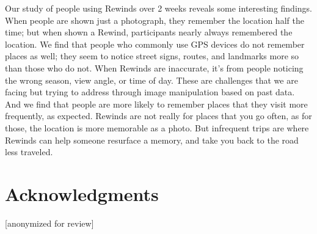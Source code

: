 \documentclass{sigchi}
\begin{document}
Our study of people using Rewinds over 2 weeks reveals some interesting findings. When people are shown just a photograph, they remember the location half the time; but when shown a Rewind, participants nearly always remembered the location. We find that people who commonly use GPS devices do not remember places as well; they seem to notice street signs, routes, and landmarks more so than those who do not. When Rewinds are inaccurate, it's from people noticing the wrong season, view angle, or time of day. These are challenges that we are facing but trying to address through image manipulation based on past data. And we find that people are more likely to remember places that they visit more frequently, as expected. Rewinds are not really for places that you go often, as for those, the location is more memorable as a photo. But infrequent trips are where Rewinds can help someone resurface a memory, and take you back to the road less traveled.

\section{Acknowledgments}
[anonymized for review]

\balance



\end{document}
